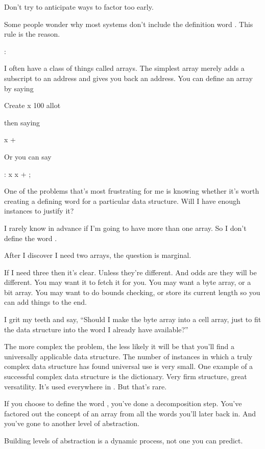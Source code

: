 \begin{tip}
Don't try to anticipate ways to factor too early.
\end{tip}%
Some people wonder why most \Forth{} systems don't include the
definition word . This rule is the reason.
\begin{interview}
:
\begin{tfquot}
I often have a class of things called arrays. The simplest array
merely adds a subscript to an address and gives you back an
address. You can define an array by saying
\begin{Code}
Create x   100 allot
\end{Code}
then saying
\begin{Code}
x +
\end{Code}
Or you can say
\begin{Code}
: x   x + ;
\end{Code}
One of the problems that's most frustrating for me is knowing whether
it's worth creating a defining word for a particular data structure.
Will I have enough instances to justify it?

I rarely know in advance if I'm going to have more than one array. So
I don't define the word .

After I discover I need two arrays, the question is marginal.

If I need three then it's clear. Unless they're different. And odds
are they will be different. You may want it to fetch it for you. You
may want a byte array, or a bit array. You may want to do bounds
checking, or store its current length so you can add things to the
end.

I grit my teeth and say, ``Should I make the byte array into a cell
array, just to fit the data structure into the word I already have
available?''

The more complex the problem, the less likely it will be that you'll
find a universally applicable data structure. The number of instances
in which a truly complex data structure has found universal use is
very small. One example of a successful complex data structure is the
\Forth{} dictionary. Very firm structure, great versatility. It's used
everywhere in \Forth{}. But that's rare.

If you choose to define the word , you've done a
decomposition step. You've factored out the concept of an array from
all the words you'll later back in. And you've gone to another level
of abstraction.

Building levels of abstraction is a dynamic process, not one you can
predict.
\end{tfquot}
\end{interview}%
